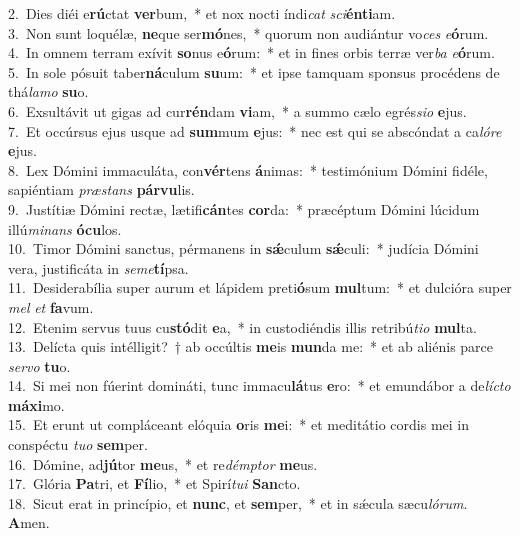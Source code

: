 {2.~}Dies diéi e\textbf{rú}ctat \textbf{ver}bum,~* et nox nocti índi\textit{cat} \textit{sci}\textbf{én}\textbf{ti}am.\\
{3.~}Non sunt loquélæ, \textbf{ne}que ser\textbf{mó}nes,~* quorum non audiántur vo\textit{ces} \textit{e}\textbf{ó}rum.\\
{4.~}In omnem terram exívit \textbf{so}nus e\textbf{ó}rum:~* et in fines orbis terræ ver\textit{ba} \textit{e}\textbf{ó}rum.\\
{5.~}In sole pósuit taber\textbf{ná}culum \textbf{su}um:~* et ipse tamquam sponsus procédens de thá\textit{la}\textit{mo} \textbf{su}o.\\
{6.~}Exsultávit ut gigas ad cur\textbf{rén}dam \textbf{vi}am,~* a summo cælo egrés\textit{si}\textit{o} \textbf{e}jus.\\
{7.~}Et occúrsus ejus usque ad \textbf{sum}mum \textbf{e}jus:~* nec est qui se abscóndat a ca\textit{ló}\textit{re} \textbf{e}jus.\\
{8.~}Lex Dómini immaculáta, con\textbf{vér}tens \textbf{á}nimas:~* testimónium Dómini fidéle, sapiéntiam \textit{præ}\textit{stans} \textbf{pár}\textbf{vu}lis.\\
{9.~}Justítiæ Dómini rectæ, lætifi\textbf{cán}tes \textbf{cor}da:~* præcéptum Dómini lúcidum illú\textit{mi}\textit{nans} \textbf{ó}\textbf{cu}los.\\
{10.~}Timor Dómini sanctus, pérmanens in \textbf{sǽ}culum \textbf{sǽ}culi:~* judícia Dómini vera, justificáta in \textit{se}\textit{me}\textbf{tí}psa.\\
{11.~}Desiderabília super aurum et lápidem preti\textbf{ó}sum \textbf{mul}tum:~* et dulcióra super \textit{mel} \textit{et} \textbf{fa}vum.\\
{12.~}Etenim servus tuus cu\textbf{stó}dit \textbf{e}a,~* in custodiéndis illis retribú\textit{ti}\textit{o} \textbf{mul}ta.\\
{13.~}Delícta quis intélligit?~† ab occúltis \textbf{me}is \textbf{mun}da me:~* et ab aliénis parce \textit{ser}\textit{vo} \textbf{tu}o.\\
{14.~}Si mei non fúerint domináti, tunc immacu\textbf{lá}tus \textbf{e}ro:~* et emundábor a de\textit{lí}\textit{cto} \textbf{má}\textbf{xi}mo.\\
{15.~}Et erunt ut compláceant elóquia \textbf{o}ris \textbf{me}i:~* et meditátio cordis mei in conspéctu \textit{tu}\textit{o} \textbf{sem}per.\\
{16.~}Dómine, ad\textbf{jú}tor \textbf{me}us,~* et re\textit{dém}\textit{ptor} \textbf{me}us.\\
{17.~}Glória \textbf{Pa}tri, et \textbf{Fí}lio,~* et Spirí\textit{tu}\textit{i} \textbf{San}cto.\\
{18.~}Sicut erat in princípio, et \textbf{nunc}, et \textbf{sem}per,~* et in sǽcula sæcu\textit{ló}\textit{rum}. \textbf{A}men.\\
